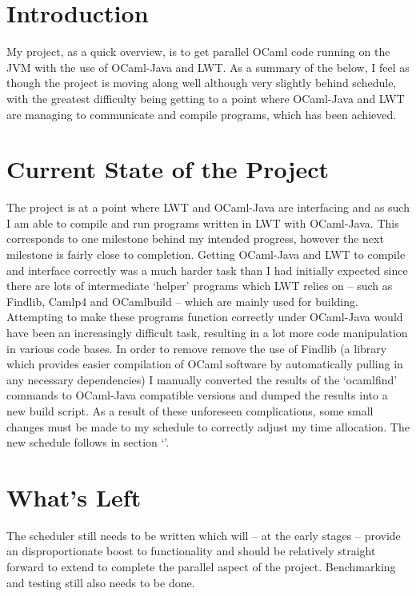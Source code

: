 \documentclass[a4paper]{article}
\begin{document}


\section{Introduction}
\label{Introduction}
My project, as a quick overview, is to get parallel OCaml code running on the JVM with the use of OCaml-Java and LWT. As a summary of the below, I feel as though the project is moving along well although very slightly behind schedule, with the greatest difficulty being getting to a point where OCaml-Java and LWT are managing to communicate and compile programs, which has been achieved.

\section{Current State of the Project}
\label{Current State of the Project}
The project is at a point where LWT and OCaml-Java are interfacing and as such I am able to compile and run programs written in LWT with OCaml-Java. This corresponds to one milestone behind my intended progress, however the next milestone is fairly close to completion. Getting OCaml-Java and LWT to compile and interface correctly was a much harder task than I had initially expected since there are lots of intermediate `helper' programs which LWT relies on -- such as Findlib, Camlp4 and OCamlbuild -- which are mainly used for building. Attempting to make these programs function correctly under OCaml-Java would have been an increasingly difficult task, resulting in a lot more code manipulation in various code bases. In order to remove remove the use of Findlib (a library which provides easier compilation of OCaml software by automatically pulling in any necessary dependencies) I manually converted the results of the `ocamlfind' commands to OCaml-Java compatible versions and dumped the results into a new build script. As a result of these unforeseen complications, some small changes must be made to my schedule to correctly adjust my time allocation. The new schedule follows in section `'.

\section{What's Left}
\label{What's Left}
The scheduler still needs to be written which will -- at the early stages -- provide an disproportionate boost to functionality and should be relatively straight forward to extend to complete the parallel aspect of the project. Benchmarking and testing still also needs to be done.
\end{document}
